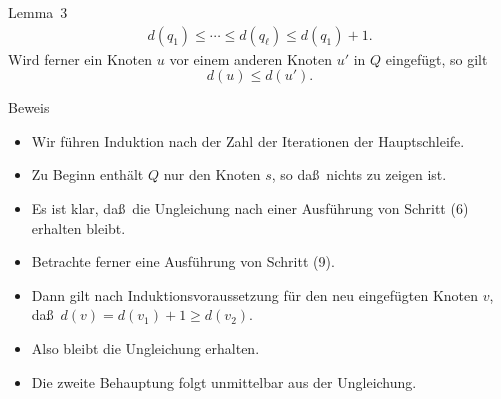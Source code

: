 \documentclass[aspectratio=1610, 11pt]{beamer}
\begin{document}
\begin{frame}
\begin{overprint}
\begin{block}{Lemma~3}
			\begin{align*}
				d(q_1)\leq\cdots\leq d(q_\ell)\leq d(q_1)+1.
			\end{align*}
			Wird ferner ein Knoten $u$ vor einem anderen Knoten $u'$ in $Q$ eingef\"ugt, so gilt $$d(u)\leq d(u').$$
		\end{block}
		\begin{exampleblock}{Beweis}
			\begin{itemize}
				\item Wir f\"uhren Induktion nach der Zahl der Iterationen der Hauptschleife.
				\item Zu Beginn enth\"alt $Q$ nur den Knoten $s$, so da\ss\ nichts zu zeigen ist.
				\item Es ist klar, da\ss\ die Ungleichung nach einer Ausf\"uhrung von Schritt (6) erhalten bleibt.
				\item Betrachte ferner eine Ausf\"uhrung von Schritt (9).
				\item Dann gilt nach Induktionsvoraussetzung f\"ur den neu eingef\"ugten Knoten $v$, da\ss\ $d(v)=d(v_1)+1\geq d(v_2)$.
				\item Also bleibt die Ungleichung erhalten.
				\item Die zweite Behauptung folgt unmittelbar aus der Ungleichung.
			\end{itemize}
		\end{exampleblock}
	\end{overprint}
\end{frame}
\end{document}
